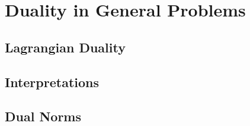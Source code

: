\chapter{Duality in General Problems}
\label{chap:duality_general}

\section{Lagrangian Duality}
\label{sec:lagrangian_duality}

\section{Interpretations}
\label{sec:duality_interpretations}

\section{Dual Norms}
\label{sec:dual_norms}



